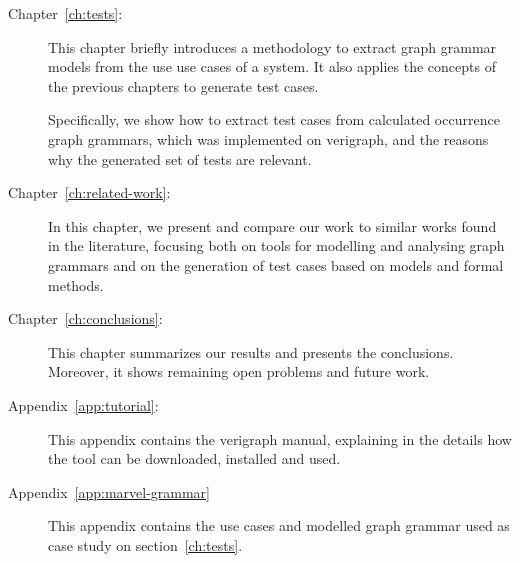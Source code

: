 \begin{description}
  \item[Chapter~\ref{ch:tests}:] This chapter briefly introduces a methodology to extract graph grammar models from the use use cases of a system. It also applies the concepts of the previous chapters to generate test cases.

    Specifically, we show how to extract test cases from calculated occurrence graph grammars, which was implemented on verigraph, and the reasons why the generated set of tests are relevant.

  \item[Chapter~\ref{ch:related-work}:] In this chapter, we present and compare our work to similar works found in the literature, focusing both on tools for modelling and analysing graph grammars and on the generation of test cases based on models and formal methods.

  \item[Chapter~\ref{ch:conclusions}:] This chapter summarizes our results and presents the conclusions. Moreover, it shows remaining open problems and future work.

  \item[Appendix~\ref{app:tutorial}:] This appendix contains the verigraph manual, explaining in the details how the tool can be downloaded, installed and used.

  \item[Appendix~\ref{app:marvel-grammar}] This appendix contains the use cases and modelled graph grammar used as case study on section~\ref{ch:tests}.
\end{description}
